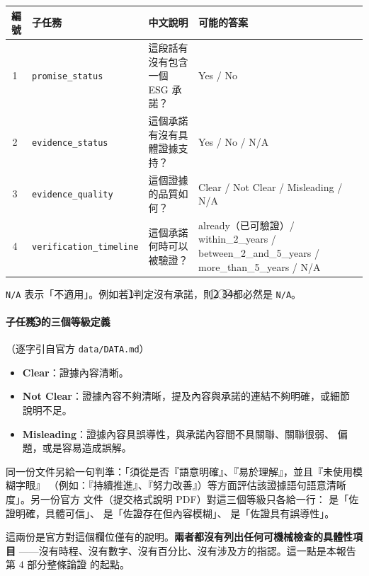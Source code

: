 \documentclass[11pt,a4paper]{ctexart}
\newcommand{\fieldname}[1]{\texttt{#1}}
\begin{document}
\begin{table}[h]
\centering
\small
\begin{tabular}{@{}clp{4.2cm}p{5.5cm}@{}}
\toprule
編號 & 子任務 & 中文說明 & 可能的答案 \\
\midrule
\textcircled{1} & \fieldname{promise\_status} & 這段話有沒有包含一個 ESG 承諾？ & Yes / No \\
\textcircled{2} & \fieldname{evidence\_status} & 這個承諾有沒有具體證據支持？ & Yes / No / N/A \\
\textcircled{3} & \fieldname{evidence\_quality} & 這個證據的品質如何？ & Clear / Not Clear / Misleading / N/A \\
\textcircled{4} & \fieldname{verification\_timeline} & 這個承諾何時可以被驗證？ & already（已可驗證）/ within\_2\_years / between\_2\_and\_5\_years / more\_than\_5\_years / N/A \\
\bottomrule
\end{tabular}
\end{table}

\fieldname{N/A} 表示「不適用」。例如若\textcircled{1}判定沒有承諾，則\textcircled{2}
\textcircled{3}\textcircled{4}都必然是 \fieldname{N/A}。

\paragraph{子任務\textcircled{3}的三個等級定義}（逐字引自官方 \texttt{data/DATA.md}）
\begin{itemize}[leftmargin=2em, itemsep=2pt]
  \item \textbf{Clear}：證據內容清晰。
  \item \textbf{Not Clear}：證據內容不夠清晰，提及內容與承諾的連結不夠明確，或細節
        說明不足。
  \item \textbf{Misleading}：證據內容具誤導性，與承諾內容間不具關聯、關聯很弱、
        偏題，或是容易造成誤解。
\end{itemize}

同一份文件另給一句判準：「須從是否『語意明確』、『易於理解』，並且『未使用模糊字眼』
（例如：『持續推進』、『努力改善』）等方面評估該證據語句語意清晰度」。另一份官方
文件（提交格式說明 PDF）對這三個等級只各給一行： 是「佐證明確，具體可信」、
 是「佐證存在但內容模糊」、 是「佐證具有誤導性」。

\begin{tcolorbox}[colback=gray!8, colframe=gray!55]
這兩份是官方對這個欄位僅有的說明。\textbf{兩者都沒有列出任何可機械檢查的具體性項目}
——沒有時程、沒有數字、沒有百分比、沒有涉及方的指認。這一點是本報告第 4 部分整條論證
的起點。
\end{tcolorbox}
\end{document}
